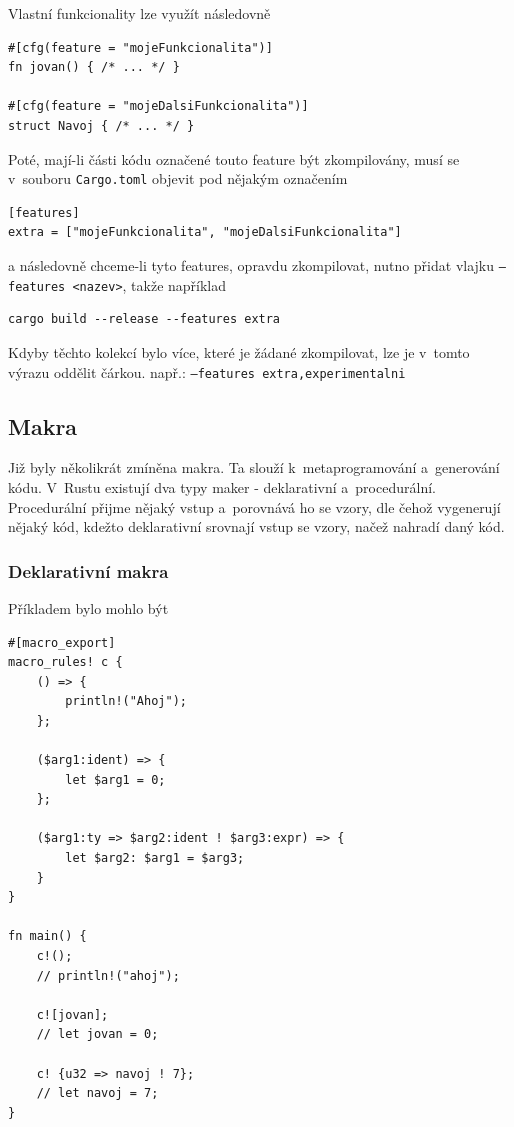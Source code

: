 \documentclass[a4paper, 12pt]{article} %
\begin{document}
			Vlastní funkcionality lze využít následovně
			\begin{verbatim}
#[cfg(feature = "mojeFunkcionalita")]
fn jovan() { /* ... */ }

#[cfg(feature = "mojeDalsiFunkcionalita")]
struct Navoj { /* ... */ }
			\end{verbatim}
			
			Poté, mají-li části kódu označené touto feature být zkompilovány, musí se v~souboru \texttt{Cargo.toml} objevit pod nějakým označením
			\begin{verbatim}
[features]
extra = ["mojeFunkcionalita", "mojeDalsiFunkcionalita"]
			\end{verbatim}
			
			a následovně chceme-li tyto features, opravdu zkompilovat, nutno přidat vlajku \texttt{--features <nazev>}, takže například
			\begin{verbatim}
cargo build --release --features extra 
			\end{verbatim}
			
			Kdyby těchto kolekcí bylo více, které je žádané zkompilovat, lze je v~tomto výrazu oddělit čárkou. např.: \texttt{--features extra,experimentalni} 


	\subsection{Makra}
		Již byly několikrát zmíněna makra. Ta slouží k~metaprogramování a~generování kódu. V~Rustu existují dva typy maker - deklarativní a~procedurální. Procedurální přijme nějaký vstup a~porovnává ho se vzory, dle čehož vygenerují nějaký kód, kdežto deklarativní srovnají vstup se vzory, načež nahradí daný kód.


		\subsubsection*{Deklarativní makra}
			Příkladem bylo mohlo být
			\begin{verbatim}
#[macro_export]
macro_rules! c {
	() => {
		println!("Ahoj");
	};

	($arg1:ident) => {
		let $arg1 = 0;
	};
	
	($arg1:ty => $arg2:ident ! $arg3:expr) => {
		let $arg2: $arg1 = $arg3;
	}
}

fn main() {
	c!();
	// println!("ahoj");
	
	c![jovan];
	// let jovan = 0;
	
	c! {u32 => navoj ! 7};
	// let navoj = 7;
}
			\end{verbatim}
\end{document}
